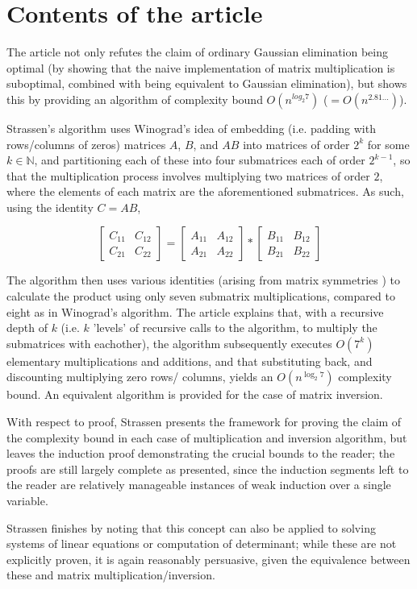 \documentclass[11pt]{article}
\begin{document}
\section{Contents of the article}

The article not only refutes the claim of ordinary Gaussian elimination 
being optimal (by showing that the naive implementation of matrix 
multiplication is suboptimal, combined with being equivalent to Gaussian 
elimination), but shows this by providing an algorithm of complexity bound 
$O(n^{log_{2}7})$ ($= O(n^{2.81...})$). \par
Strassen's algorithm uses Winograd's idea \cite{winograd1968new} of embedding 
(i.e. padding with rows/columns of zeros) matrices $A$, $B$, and $AB$ into 
matrices of order $2^k$ for some $k \in \mathbb{N}$, and partitioning each of 
these into four submatrices each of order $2^{k-1}$, so that the 
multiplication process involves multiplying two matrices of order $2$, where 
the elements of each matrix are the aforementioned submatrices. As such, using 
the identity $C = AB$, \par
$$
\begin{bmatrix}
    C_{11} & C_{12} \\
    C_{21} & C_{22}
\end{bmatrix}
=
\begin{bmatrix}
    A_{11} & A_{12} \\
    A_{21} & A_{22}
\end{bmatrix}
*
\begin{bmatrix}
    B_{11} & B_{12} \\
    B_{21} & B_{22}
\end{bmatrix}
$$
\par
The algorithm then uses various identities (arising from matrix symmetries
\cite{gates2001strassen}) to calculate the product using only seven 
submatrix multiplications, compared to eight as in Winograd's algorithm. The 
article explains that, with a recursive depth of $k$ (i.e. $k$ 'levels' of 
recursive calls to the algorithm, to multiply the submatrices with eachother), 
the algorithm subsequently executes $O(7^k)$ elementary multiplications and 
additions, and that substituting back, and discounting multiplying zero rows/
columns, yields an $O(n^{\log_{2}7})$ complexity bound. An equivalent algorithm 
is provided for the case of matrix inversion. \par
With respect to proof, Strassen presents the framework for proving the claim 
of the complexity bound in each case of multiplication and inversion algorithm, 
but leaves the induction proof demonstrating the crucial bounds to the reader; 
the proofs are still largely complete as presented, since the induction 
segments left to the reader are relatively manageable instances of weak 
induction over a single variable. \par
Strassen finishes by noting that this concept can also be applied to solving 
systems of linear equations or computation of determinant; while these are not 
explicitly proven, it is again reasonably persuasive, given the equivalence 
between these and matrix multiplication/inversion. \par
\end{document}
